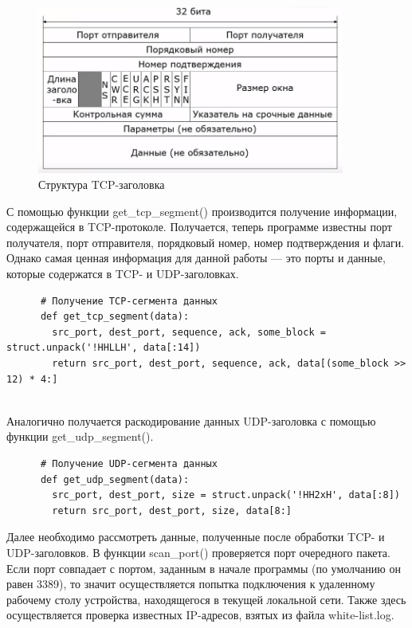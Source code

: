 \documentclass[bachelor, och, coursework]{SCWorks}
\begin{document}
    \begin{figure}[H]
      \centering
      \includegraphics[width=0.9\textwidth]{photo/tcp-segment.jpg}
      \caption{Структура TCP-заголовка}
      \label{tcp-header}
    \end{figure}
    
    С помощью функции get\_tcp\_segment() производится получение информации, содержащейся в TCP-протоколе. Получается, теперь программе известны порт получателя,
    порт отправителя, порядковый номер, номер подтверждения и флаги. Однако самая ценная информация для данной работы --- это порты и данные, которые
    содержатся в TCP- и UDP-заголовках.

    \begin{verbatim}
      # Получение TCP-cегмента данных
      def get_tcp_segment(data):
        src_port, dest_port, sequence, ack, some_block = struct.unpack('!HHLLH', data[:14])
        return src_port, dest_port, sequence, ack, data[(some_block >> 12) * 4:]
    
    \end{verbatim}

    Аналогично получается раскодирование данных UDP-заголовка с помощью функции get\_udp\_segment().

    \begin{verbatim}
      # Получение UDP-сегмента данных
      def get_udp_segment(data):
        src_port, dest_port, size = struct.unpack('!HH2xH', data[:8])
        return src_port, dest_port, size, data[8:]
    \end{verbatim}      

    Далее необходимо рассмотреть данные, полученные после обработки TCP- и UDP-заголовков. В функции scan\_port() проверяется порт очередного пакета.
    Если порт совпадает с портом, заданным в начале программы (по умолчанию он равен 3389), то значит осуществляется попытка подключения к удаленному рабочему
    столу устройства, находящегося в текущей локальной сети. Также здесь осуществляется проверка известных IP-адресов, взятых из файла white-list.log. 
\end{document}
